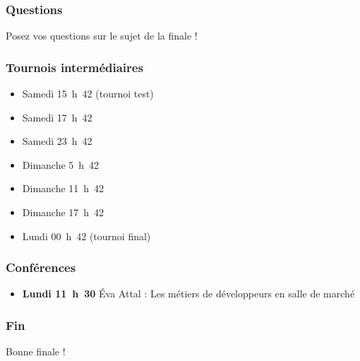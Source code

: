 \documentclass{beamer}
\begin{document}
\begin{frame}
    \frametitle{Questions}
    Posez vos questions sur le sujet de la finale !
\end{frame}

\begin{frame}
    \frametitle{Tournois intermédiaires}
    \begin{itemize}
        \item Samedi 15~h~42 (tournoi test)
        \item Samedi 17~h~42
        \item Samedi 23~h~42
        \item Dimanche 5~h~42
        \item Dimanche 11~h~42
        \item Dimanche 17~h~42
        \item Lundi 00~h~42 (tournoi final)
    \end{itemize}
\end{frame}

\begin{frame}
    \frametitle{Conférences}
    \begin{itemize}
        \item \textbf{Lundi 11~h~30} Éva Attal : Les métiers de développeurs en salle de marché
    \end{itemize}
\end{frame}

\begin{frame}
    \frametitle{Fin}
    Bonne finale !
\end{frame}
\end{document}
